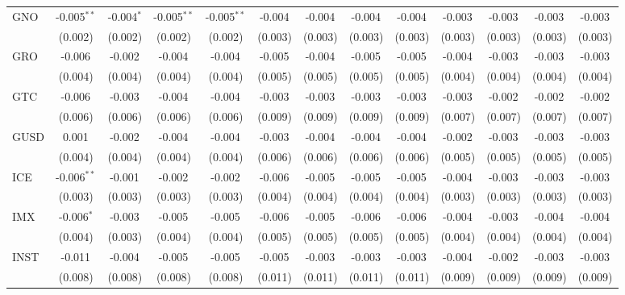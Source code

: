 \begin{table}[!htbp]
\begin{tabular}{@{\extracolsep{5pt}}lcccccccccccc}
 GNO & -0.005$^{**}$ & -0.004$^{*}$ & -0.005$^{**}$ & -0.005$^{**}$ & -0.004$^{}$ & -0.004$^{}$ & -0.004$^{}$ & -0.004$^{}$ & -0.003$^{}$ & -0.003$^{}$ & -0.003$^{}$ & -0.003$^{}$ \\
  & (0.002) & (0.002) & (0.002) & (0.002) & (0.003) & (0.003) & (0.003) & (0.003) & (0.003) & (0.003) & (0.003) & (0.003) \\
 GRO & -0.006$^{}$ & -0.002$^{}$ & -0.004$^{}$ & -0.004$^{}$ & -0.005$^{}$ & -0.004$^{}$ & -0.005$^{}$ & -0.005$^{}$ & -0.004$^{}$ & -0.003$^{}$ & -0.003$^{}$ & -0.003$^{}$ \\
  & (0.004) & (0.004) & (0.004) & (0.004) & (0.005) & (0.005) & (0.005) & (0.005) & (0.004) & (0.004) & (0.004) & (0.004) \\
 GTC & -0.006$^{}$ & -0.003$^{}$ & -0.004$^{}$ & -0.004$^{}$ & -0.003$^{}$ & -0.003$^{}$ & -0.003$^{}$ & -0.003$^{}$ & -0.003$^{}$ & -0.002$^{}$ & -0.002$^{}$ & -0.002$^{}$ \\
  & (0.006) & (0.006) & (0.006) & (0.006) & (0.009) & (0.009) & (0.009) & (0.009) & (0.007) & (0.007) & (0.007) & (0.007) \\
 GUSD & 0.001$^{}$ & -0.002$^{}$ & -0.004$^{}$ & -0.004$^{}$ & -0.003$^{}$ & -0.004$^{}$ & -0.004$^{}$ & -0.004$^{}$ & -0.002$^{}$ & -0.003$^{}$ & -0.003$^{}$ & -0.003$^{}$ \\
  & (0.004) & (0.004) & (0.004) & (0.004) & (0.006) & (0.006) & (0.006) & (0.006) & (0.005) & (0.005) & (0.005) & (0.005) \\
 ICE & -0.006$^{**}$ & -0.001$^{}$ & -0.002$^{}$ & -0.002$^{}$ & -0.006$^{}$ & -0.005$^{}$ & -0.005$^{}$ & -0.005$^{}$ & -0.004$^{}$ & -0.003$^{}$ & -0.003$^{}$ & -0.003$^{}$ \\
  & (0.003) & (0.003) & (0.003) & (0.003) & (0.004) & (0.004) & (0.004) & (0.004) & (0.003) & (0.003) & (0.003) & (0.003) \\
 IMX & -0.006$^{*}$ & -0.003$^{}$ & -0.005$^{}$ & -0.005$^{}$ & -0.006$^{}$ & -0.005$^{}$ & -0.006$^{}$ & -0.006$^{}$ & -0.004$^{}$ & -0.003$^{}$ & -0.004$^{}$ & -0.004$^{}$ \\
  & (0.004) & (0.003) & (0.004) & (0.004) & (0.005) & (0.005) & (0.005) & (0.005) & (0.004) & (0.004) & (0.004) & (0.004) \\
 INST & -0.011$^{}$ & -0.004$^{}$ & -0.005$^{}$ & -0.005$^{}$ & -0.005$^{}$ & -0.003$^{}$ & -0.003$^{}$ & -0.003$^{}$ & -0.004$^{}$ & -0.002$^{}$ & -0.003$^{}$ & -0.003$^{}$ \\
  & (0.008) & (0.008) & (0.008) & (0.008) & (0.011) & (0.011) & (0.011) & (0.011) & (0.009) & (0.009) & (0.009) & (0.009) \\

\end{tabular}
\end{table}
